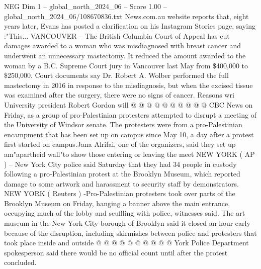 \begin{textsample}{NEG Dim 1 – global\_north\_2024\_06 – Score 1.00 – global\_north\_2024\_06/108670836.txt}
News.com.au website reports that, eight years later, Evans has posted a clarification on his Instagram Stories page, saying :"This...
VANCOUVER -- The British Columbia Court of Appeal has cut damages awarded to a woman who was misdiagnosed with breast cancer and underwent an unnecessary mastectomy.
It reduced the amount awarded to the woman by a B.C.
Supreme Court jury in Vancouver last May from \$400,000 to \$250,000.
Court documents say Dr.
Robert A.
Wolber performed the full mastectomy in 2016 in response to the misdiagnosis, but when the excised tissue was examined after the surgery, there were no signs of cancer.
Reasons wri University president Robert Gordon will @ @ @ @ @ @ @ @ @ @ CBC News on Friday, as a group of pro-Palestinian protesters attempted to disrupt a meeting of the University of Windsor senate.
The protesters were from a pro-Palestinian encampment that has been set up on campus since May 10, a day after a protest first started on campus.Jana Alrifai, one of the organizers, said they set up am"apartheid wall"to show those entering or leaving the meet NEW YORK ( AP ) -- New York City police said Saturday that they had 34 people in custody following a pro-Palestinian protest at the Brooklyn Museum, which reported damage to some artwork and harassment to security staff by demonstrators.
NEW YORK ( Reuters ) -Pro-Palestinian protesters took over parts of the Brooklyn Museum on Friday, hanging a banner above the main entrance, occupying much of the lobby and scuffling with police, witnesses said.
The art museum in the New York City borough of Brooklyn said it closed an hour early because of the disruption, including skirmishes between police and protesters that took place inside and outside @ @ @ @ @ @ @ @ @ @ York Police Department spokesperson said there would be no official count until after the protest concluded.

\end{textsample}
